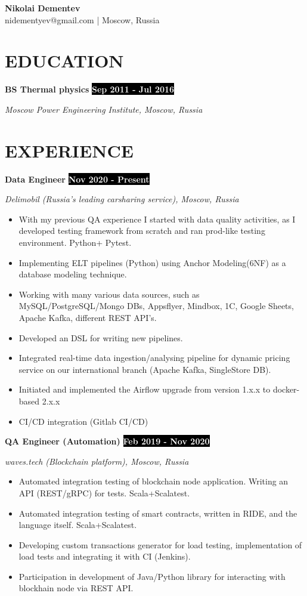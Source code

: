 \documentclass[11pt,a4paper]{article}
\newcommand{\timeperiod}[1]{%
    \hfill{\small\colorbox{black}{\textcolor{white}{\textbf{#1}}}}\par%
}
\newcommand{\jobsep}{\vspace{1.5em}}
\begin{document}
\begin{flushright}
{\huge\textbf{Nikolai Dementev}}\\[4pt]
{\normalsize nidementyev@gmail.com | Moscow, Russia}
\end{flushright}

\section{EDUCATION}
\textbf{BS Thermal physics}\timeperiod{Sep 2011 - Jul 2016}
\textit{Moscow Power Engineering Institute, Moscow, Russia}

\section{EXPERIENCE}
\textbf{Data Engineer}\timeperiod{Nov 2020 - Present}
\textit{Delimobil (Russia's leading carsharing service), Moscow, Russia}
\begin{itemize}
    \item With my previous QA experience I started with data quality activities, as I developed testing framework from scratch and ran prod-like testing environment. Python+ Pytest.
    \item Implementing ELT pipelines (Python) using Anchor Modeling(6NF) as a database modeling technique.
    \item Working with many various data sources, such as MySQL/PostgreSQL/Mongo DBs, Appsflyer, Mindbox, 1C, Google Sheets, Apache Kafka, different REST API's.
    \item Developed an DSL for writing new pipelines.
    \item Integrated real-time data ingestion/analysing pipeline for dynamic pricing service on our international branch (Apache Kafka, SingleStore DB).
    \item Initiated and implemented the Airflow upgrade from version 1.x.x to docker-based 2.x.x
    \item CI/CD integration (Gitlab CI/CD)
\end{itemize}

\jobsep
\textbf{QA Engineer (Automation)}\timeperiod{Feb 2019 - Nov 2020}
\textit{waves.tech (Blockchain platform), Moscow, Russia}
\begin{itemize}
    \item Automated integration testing of blockchain node application. Writing an API (REST/gRPC) for tests. Scala+Scalatest.
    \item Automated integration testing of smart contracts, written in RIDE, and the language itself. Scala+Scalatest.
    \item Developing custom transactions generator for load testing, implementation of load tests and integrating it with CI (Jenkins).
    \item Participation in development of Java/Python library for interacting with blockhain node via REST API.
\end{itemize}
\end{document}
